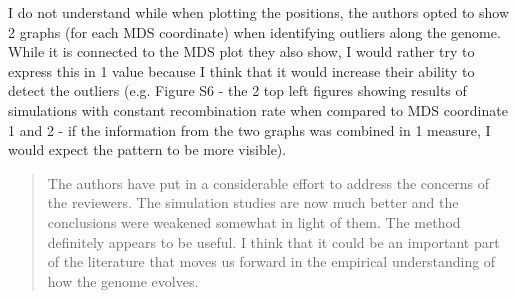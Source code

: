 
\begin{point}{}
    I do not understand while when plotting the positions, the authors opted to show 2 graphs (for each MDS coordinate) when identifying outliers along the genome. While it is connected to the MDS plot they also show, I would rather try to express this in 1 value because I think that it would increase their ability to detect the outliers (e.g. Figure S6 - the 2 top left figures showing results of simulations with constant recombination rate when compared to MDS coordinate 1 and 2 - if the information from the two graphs was combined in 1 measure, I would expect the pattern to be more visible).
\end{point}




\begin{quote}
    The authors have put in a considerable effort to address the concerns of the reviewers. The simulation studies are now much better and the conclusions were weakened somewhat in light of them. The method definitely appears to be useful. I think that it could be an important part of the literature that moves us forward in the empirical understanding of how the genome evolves.
\end{quote}

